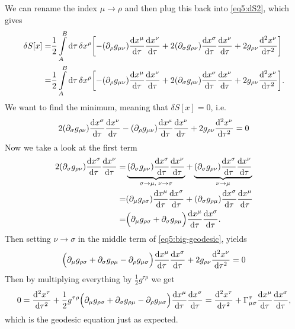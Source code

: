 \documentclass[11pt,a4paper, 
swedish, english %
]{article}
\begin{document}
We can rename the index $\mu\to\rho$ and then plug this back into
\eqref{eq5:dS2}, which gives
\begin{equation}%
\begin{aligned}
\delta{S}[x]=&\frac{1}{2}\int_A^B\rd\tau\,\delta{x}^\rho
\qty[ -(\pd_{\rho}g_{\mu\nu})\dv{x^\mu}{\tau}\dv{x^\nu}{\tau}
+2(\pd_\sigma g_{\rho\nu})\dv{x^\sigma}{\tau}\dv{x^\nu}{\tau}
+2g_{\rho\nu}\dv[2]{x^\nu}{\tau} ]\\
=&\frac{1}{2}\int_A^B\rd\tau\,\delta{x}^\rho 
\qty[ -(\pd_{\rho}g_{\mu\nu})\dv{x^\mu}{\tau}\dv{x^\nu}{\tau}
+2(\pd_\sigma g_{\rho\nu})\dv{x^\sigma}{\tau}\dv{x^\nu}{\tau}
+2g_{\rho\nu}\dv[2]{x^\nu}{\tau} ].
\end{aligned}
\end{equation}
We want to find the minimum, meaning that $\delta{S}[x]=0$, i.e.
\begin{equation}\label{eq5:big-geodesic}
2(\partial_\sigma g_{\rho\nu})\dv{x^\sigma}{\tau}\dv{x^\nu}{\tau}
-(\partial_{\rho}g_{\mu\nu})\dv{x^\mu}{\tau}\dv{x^\nu}{\tau}
+2g_{\rho\nu}\dv[2]{x^\nu}{\tau} =0
\end{equation}
Now we take a look at the first term
\begin{equation}
\begin{aligned}
2(\partial_\sigma g_{\rho\nu})\dv{x^\sigma}{\tau}\dv{x^\nu}{\tau}=&
\underbrace{(\partial_{\sigma}g_{\rho\nu})
  \dv{x^\sigma}{\tau}\dv{x^\nu}{\tau}}
_{\sigma\to\mu,\;\nu\to\sigma}
+\underbrace{(\partial_{\sigma}g_{\rho\nu})
  \dv{x^\sigma}{\tau}\dv{x^\nu}{\tau}}
_{\nu\to\mu}\\
=&(\partial_\mu g_{\rho\sigma})\dv{x^\mu}{\tau}\dv{x^\sigma}{\tau}
+(\partial_\sigma g_{\rho\mu})\dv{x^\sigma}{\tau}\dv{x^\mu}{\tau}\\
=&\Big(\partial_\mu g_{\rho\sigma}+\partial_\sigma g_{\rho\mu}\Big)
\dv{x^\mu}{\tau}\dv{x^\sigma}{\tau}.
\end{aligned}
\end{equation}
Then setting $\nu\to\sigma$ in the middle term of
\eqref{eq5:big-geodesic}, yields
\begin{equation}
\Big(\partial_\mu g_{\rho\sigma}+\partial_\sigma g_{\rho\mu}
-\partial_{\rho}g_{\mu\sigma}\Big)
\dv{x^\mu}{\tau}\dv{x^\sigma}{\tau}
+2g_{\rho\nu}\dv[2]{x^\nu}{\tau} =0
\end{equation}
Then by multiplying everything by $\frac{1}{2}g^{\tau\rho}$ we get
\begin{equation}
0=\dv[2]{x^\tau}{\tau} +
\frac{1}{2}g^{\tau\rho}
\Big(\partial_\mu g_{\rho\sigma}+\partial_\sigma g_{\rho\mu}
-\partial_{\rho}g_{\mu\sigma}\Big)
\dv{x^\mu}{\tau}\dv{x^\sigma}{\tau}
=\dv[2]{x^\tau}{\tau} +
\Gamma^\tau_{\mu\sigma}
\dv{x^\mu}{\tau}\dv{x^\sigma}{\tau},
\end{equation}
which is the geodesic equation just as expected.
\end{document}
